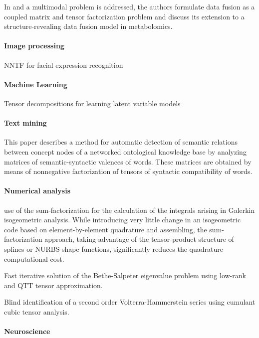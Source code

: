 \documentclass[letterpaper,12pt]{article}
\begin{document}
In \cite{Acar2015} and \cite{Acar2014} a multimodal problem is addressed, the authors formulate data fusion as a coupled matrix and tensor factorization problem and discuss its extension to a structure-revealing data fusion model in metabolomics.


\paragraph{Image processing}

\cite{An2015} NNTF for facial expression recognition


\paragraph{Machine Learning}

\cite{Anandkumar2012} Tensor decompositions for learning latent variable models

\paragraph{Text mining}

\cite{Anisimov2014} This paper describes a method for automatic detection of semantic relations between concept nodes of a networked ontological knowledge base by analyzing matrices of semantic-syntactic valences of words. These matrices are obtained by means of nonnegative factorization of tensors of syntactic compatibility of words. 


\paragraph{Numerical analysis}
 
\cite{Antolin2015} use of the sum-factorization for the calculation of the integrals arising in Galerkin isogeometric analysis. While introducing very little change in an isogeometric code based on element-by-element quadrature and assembling, the sum-factorization approach, taking advantage of the tensor-product structure of splines or NURBS shape functions, significantly reduces the quadrature computational cost.

\cite{Benner2016} Fast iterative solution of the Bethe-Salpeter eigenvalue problem using low-rank and QTT tensor approximation.


\cite{Cherif2008} Blind identification of a second order Volterra-Hammerstein series using cumulant cubic tensor analysis.

\paragraph{Neuroscience}
\end{document}
